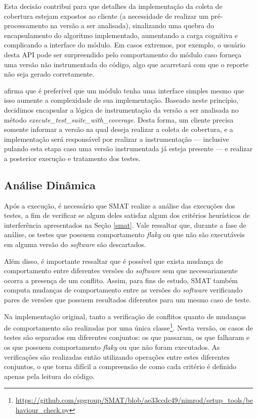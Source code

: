 \documentclass[12pt]{article}
\begin{document}
Esta decisão contribui para que detalhes da implementação da coleta de cobertura estejam expostos ao cliente (a necessidade de realizar um pré-processamento na versão a ser analisada), sinalizando uma quebra do encapsulamento do algoritmo implementado, aumentando a carga cognitiva e complicando a interface do módulo. Em casos extremos, por exemplo, o usuário desta API pode ser surpreendido pelo comportamento do módulo caso forneça uma versão não instrumentada do código, algo que acarretará com que o reporte não seja gerado corretamente.

\cite{ousterhout2018philosophy} afirma que é preferível que um módulo tenha uma interface simples mesmo que isso aumente a complexidade de sua implementação. Baseado neste princípio, decidimos encapsular a lógica de instrumentação da versão a ser analisada no método \textit{execute\_test\_suite\_with\_coverage}. Desta forma, um cliente precisa somente informar a versão na qual deseja realizar a coleta de cobertura, e a implementação será responsável por realizar a instrumentação --- inclusive pulando esta etapa caso uma versão instrumentada já esteja presente --- e realizar a posterior execução e tratamento dos testes.

\subsection{Análise Dinâmica}
Após a execução, é necessário que SMAT realize a análise das execuções dos testes, a fim de verificar se algum deles satisfaz algum dos critérios heurísticos de interferência apresentados na Seção \ref{smat}. Vale ressaltar que, durante a fase de análise, os testes que possuem comportamento \textit{flaky} ou que não são executáveis em alguma versão do \textit{software} são descartados.

Além disso, é importante ressaltar que é possível que exista mudança de comportamento entre diferentes versões do \textit{software} sem que necessariamente ocorra a presença de um conflito. Assim, para fins de estudo, SMAT também computa mudanças de comportamento entre as versões do \textit{software} verificando pares de versões que possuem resultados diferentes para um mesmo caso de teste.

Na implementação original, tanto a verificação de conflitos quanto de mudanças de comportamento são realizadas por uma única classe\footnote{\href{https://github.com/spgroup/SMAT/blob/ae33ccdc49/nimrod/setup\_tools/behaviour\_check.py}{https://github.com/spgroup/SMAT/blob/ae33ccdc49/nimrod/setup\_tools/behaviour\_check.py}}. Nesta versão, os casos de testes são separados em diferentes conjuntos: os que passaram, os que falharam e os que possuem comportamento \textit{flaky} ou que não foram executados. As verificações são realizadas então utilizando operações entre estes diferentes conjuntos, o que torna difícil a compreensão de como cada critério é definido apenas pela leitura do código.
\end{document}
